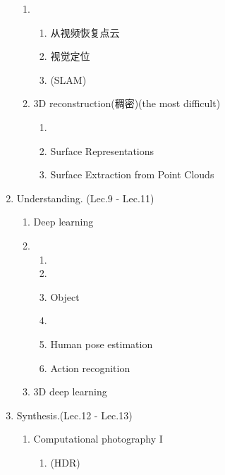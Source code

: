 \begin{enumerate}
\begin{enumerate}
            \item {}
            \begin{enumerate}
                \item 从视频恢复点云
                \item 视觉定位
                \item {} (SLAM)
            \end{enumerate}
            \item 3D reconstruction(稠密)(the most difficult)
            \begin{enumerate}
                \item {}
                \item Surface Representations
                \item Surface Extraction from Point Clouds
            \end{enumerate}
        \end{enumerate}
        \item Understanding. (Lec.9 - Lec.11)
        \begin{enumerate}
            \item Deep learning
            \item {}
            \begin{enumerate}
                \item {}
                \item {}
                \item Object 
                \item {}
                \item Human pose estimation
                \item Action recognition
            \end{enumerate}
            \item 3D deep learning
        \end{enumerate}
        \item Synthesis.(Lec.12 - Lec.13)
        \begin{enumerate}
            \item Computational photography I
            \begin{enumerate}
                \item {}(HDR)

\end{enumerate}
\end{enumerate}
\end{enumerate}
